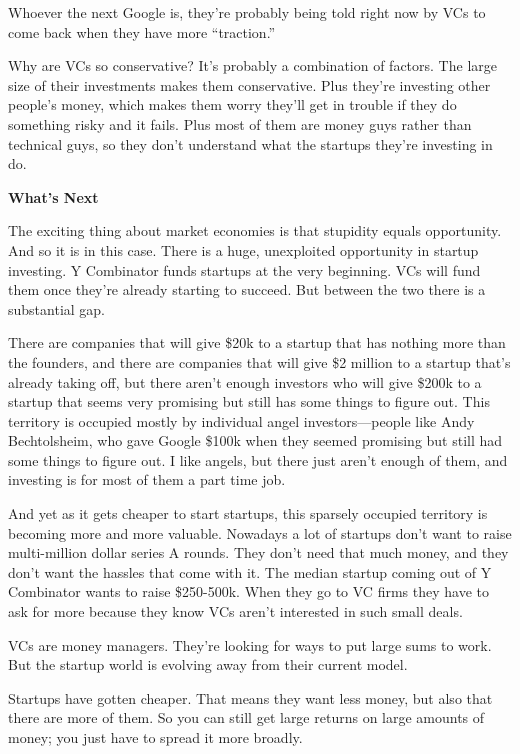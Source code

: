 Whoever the next Google is, they're probably being told right now by VCs
to come back when they have more ``traction.''

Why are VCs so conservative? It's probably a combination of factors. The
large size of their investments makes them conservative. Plus they're
investing other people's money, which makes them worry they'll get in
trouble if they do something risky and it fails. Plus most of them are
money guys rather than technical guys, so they don't understand what the
startups they're investing in do.

\textbf{What's Next}

The exciting thing about market economies is that stupidity equals
opportunity. And so it is in this case. There is a huge, unexploited
opportunity in startup investing. Y Combinator funds startups at the
very beginning. VCs will fund them once they're already starting to
succeed. But between the two there is a substantial gap.

There are companies that will give \$20k to a startup that has nothing
more than the founders, and there are companies that will give \$2
million to a startup that's already taking off, but there aren't enough
investors who will give \$200k to a startup that seems very promising
but still has some things to figure out. This territory is occupied
mostly by individual angel investors---people like Andy Bechtolsheim,
who gave Google \$100k when they seemed promising but still had some
things to figure out. I like angels, but there just aren't enough of
them, and investing is for most of them a part time job.

And yet as it gets cheaper to start startups, this sparsely occupied
territory is becoming more and more valuable. Nowadays a lot of startups
don't want to raise multi-million dollar series A rounds. They don't
need that much money, and they don't want the hassles that come with it.
The median startup coming out of Y Combinator wants to raise \$250-500k.
When they go to VC firms they have to ask for more because they know VCs
aren't interested in such small deals.

VCs are money managers. They're looking for ways to put large sums to
work. But the startup world is evolving away from their current model.

Startups have gotten cheaper. That means they want less money, but also
that there are more of them. So you can still get large returns on large
amounts of money; you just have to spread it more broadly.

